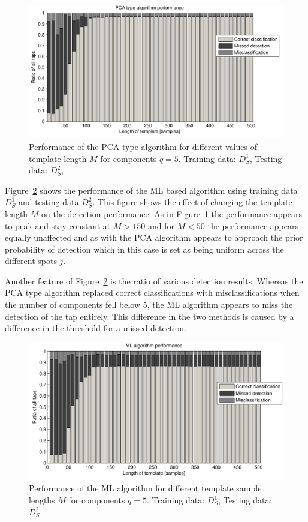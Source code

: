 \begin{figure}[!] %
\centering
\includegraphics[width=150mm]{PCAperformLength.pdf}
\caption{Performance of the PCA type algorithm for different values of template length $M$ for components $q=5$. Training data: $D^1_S$, Testing data: $D^2_S$,}\label{fig:PCAperformLength}
\end{figure}

Figure~\ref{fig:MLperform} shows the performance of the ML based algorithm using training data $D^1_S$ and testing data $D^2_S$. This figure shows the effect of changing the template length $M$ on the detection performance. As in Figure~\ref{fig:PCAperformLength} the performance appears to peak and stay constant at $M>150$ and for $M<50$ the performance appears equally unaffected and as with the PCA algorithm appears to approach the prior probability of detection which in this case is set as being uniform across the different spots $j$.

Another feature of Figure~\ref{fig:MLperform} is the ratio of various detection results. Whereas the PCA type algorithm replaced correct classifications with misclassifications when the number of components fell below 5, the ML algorithm appears to miss the detection of the tap entirely. This difference in the two methods is caused by a difference in the threshold for a missed detection.


\begin{figure}[!] %
\centering
\includegraphics[width=150mm]{MLperform.pdf}
\caption{Performance of the ML algorithm for different template sample lengths $M$ for components $q=5$. Training data: $D^1_S$, Testing data: $D^2_S$.}\label{fig:MLperform}
\end{figure}

